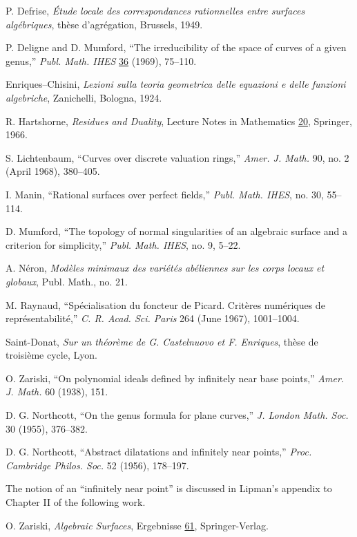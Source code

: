 \begin{description}[leftmargin=1.1cm,labelwidth=.8cm,labelsep=.3cm]
\item[{[1]}] P. Defrise, \textit{Étude locale des correspondances rationnelles
entre surfaces algébriques}, thèse d'agrégation, Brussels, 1949.

\item[{[2]}] P. Deligne and D. Mumford, ``The irreducibility of the space of
curves of a given genus,'' \textit{Publ. Math. IHES} \underline{36} (1969),
75--110.

\item[{[3]}] Enriques--Chisini, \textit{Lezioni sulla teoria geometrica delle
equazioni e delle funzioni algebriche}, Zanichelli, Bologna, 1924.

\item[{[4]}] R. Hartshorne, \textit{Residues and Duality}, Lecture Notes in
Mathematics \underline{20}, Springer, 1966.

\item[{[5]}] S. Lichtenbaum, ``Curves over discrete valuation rings,''
\textit{Amer. J. Math.} 90, no. 2 (April 1968), 380--405.

\item[{[6]}] I. Manin, ``Rational surfaces over perfect fields,''
\textit{Publ. Math. IHES}, no. 30, 55--114.

\item[{[7]}] D. Mumford, ``The topology of normal singularities of an
algebraic surface and a criterion for simplicity,'' \textit{Publ. Math. IHES},
no. 9, 5--22.

\item[{[8]}] A. Néron, \textit{Modèles minimaux des variétés abéliennes sur
les corps locaux et globaux}, Publ. Math., no. 21.


\item[{[9]}] M. Raynaud, ``Spécialisation du foncteur de Picard. Critères
numériques de représentabilité,'' \textit{C. R. Acad. Sci. Paris} 264
(June 1967), 1001--1004.

\item[{[10]}] Saint-Donat, \textit{Sur un théorème de G. Castelnuovo et
F. Enriques}, thèse de troisième cycle, Lyon.

\item[{[11]}] O. Zariski, ``On polynomial ideals defined by infinitely near
base points,'' \textit{Amer. J. Math.} 60 (1938), 151.

\item[{[12]}] D. G. Northcott, ``On the genus formula for plane curves,''
\textit{J. London Math. Soc.} 30 (1955), 376--382.

\item[{[13]}] D. G. Northcott, ``Abstract dilatations and infinitely near
points,'' \textit{Proc. Cambridge Philos. Soc.} 52 (1956), 178--197.

\item[] The notion of an ``infinitely near point'' is discussed in Lipman's
appendix to Chapter II of the following work.

\item[{[14]}] O. Zariski, \textit{Algebraic Surfaces}, Ergebnisse
\underline{61}, Springer-Verlag.
\end{description}
